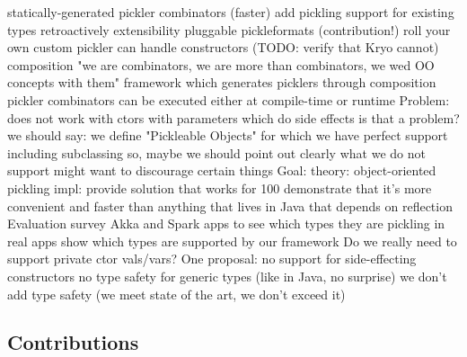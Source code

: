 \documentclass[preprint,10pt]{sigplanconf}
\begin{document}
statically-generated pickler combinators (faster)
add pickling support for existing types retroactively
extensibility
pluggable pickleformats (contribution!)
roll your own custom pickler
can handle constructors (TODO: verify that Kryo cannot)
composition
"we are combinators, we are more than combinators, we wed OO concepts with them"
framework which generates picklers through composition
pickler combinators can be executed either at compile-time or runtime
Problem: does not work with ctors with parameters which do side effects
is that a problem?
we should say: we define "Pickleable Objects" for which we have perfect support including subclassing
so, maybe we should point out clearly what we do not support
might want to discourage certain things
Goal:
theory: object-oriented pickling
impl: provide solution that works for 100%
demonstrate that it's more convenient and faster than anything that lives in Java that depends on reflection
Evaluation
survey Akka and Spark apps to see which types they are pickling in real apps
show which types are supported by our framework
Do we really need to support private ctor vals/vars?
One proposal:
no support for side-effecting constructors
no type safety for generic types (like in Java, no surprise)
we don't add type safety (we meet state of the art, we don't exceed it)


\subsection{Contributions}
\end{document}
